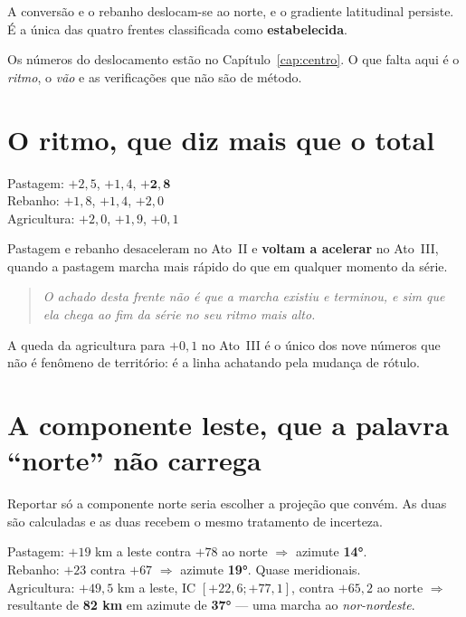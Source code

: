 A conversão e o rebanho deslocam-se ao norte, e o gradiente latitudinal
persiste. É a única das quatro frentes classificada como \textbf{estabelecida}.

Os números do deslocamento estão no Capítulo~\ref{cap:centro}. O que falta aqui
é o \emph{ritmo}, o \emph{vão} e as verificações que não são de método.

\section{O ritmo, que diz mais que o total}

\begin{ancora}
Pastagem: $+2{,}5$, $+1{,}4$, $\mathbf{+2{,}8}$ \\
Rebanho: $+1{,}8$, $+1{,}4$, $+2{,}0$ \\
Agricultura: $+2{,}0$, $+1{,}9$, $+0{,}1$
\end{ancora}

Pastagem e rebanho desaceleram no Ato~II e \textbf{voltam a acelerar} no
Ato~III, quando a pastagem marcha mais rápido do que em qualquer momento da
série.

\begin{quote}\itshape\color{cortinta}
O achado desta frente não é que a marcha existiu e terminou, e sim que ela chega
ao fim da série no seu ritmo mais alto.
\end{quote}

A queda da agricultura para $+0{,}1$ no Ato~III é o único dos nove números que
não é fenômeno de território: é a linha achatando pela mudança de rótulo.

\section{A componente leste, que a palavra ``norte'' não carrega}

Reportar só a componente norte seria escolher a projeção que convém. As duas são
calculadas e as duas recebem o mesmo tratamento de incerteza.

\begin{ancora}[Os azimutes]
Pastagem: $+19$ km a leste contra $+78$ ao norte $\Rightarrow$ azimute
\textbf{14°}. \\
Rebanho: $+23$ contra $+67$ $\Rightarrow$ azimute \textbf{19°}. Quase
meridionais. \\
Agricultura: $+49{,}5$ km a leste, IC $[+22{,}6; +77{,}1]$, contra $+65{,}2$ ao
norte $\Rightarrow$ resultante de \textbf{82 km} em azimute de \textbf{37°} ---
uma marcha ao \emph{nor-nordeste}.
\end{ancora}

